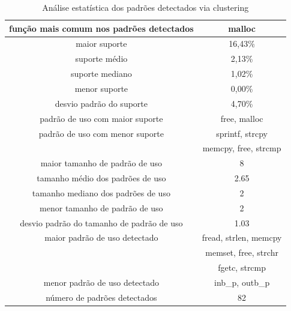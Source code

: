 \begin{table}[H]
\centering
  \begin{tabular}{ | c | c |}
\hline
função mais comum nos padrões detectados & malloc \\
\hline
maior suporte & 16,43\% \\
\hline
suporte médio & 2,13\% \\
\hline
suporte mediano & 1,02\% \\
\hline
menor suporte & 0,00\% \\
\hline
desvio padrão do suporte & 4,70\% \\
\hline
padrão de uso com maior suporte & free, malloc \\
\hline
padrão de uso com menor suporte & sprintf, strcpy \\
&  memcpy, free, strcmp \\
\hline
maior tamanho de padrão de uso & 8\\
\hline
tamanho médio dos padrões de uso & 2.65 \\
\hline
tamanho mediano dos padrões de uso & 2 \\
\hline
menor tamanho de padrão de uso & 2\\
\hline
desvio padrão do tamanho de padrão de uso & 1.03 \\
\hline
maior padrão de uso detectado & fread, strlen, memcpy\\
& memset, free, strchr\\
& fgetc, strcmp\\
\hline
menor padrão de uso detectado & inb\_p, outb\_p\\
\hline
número de padrões detectados & 82\\
\hline
\end{tabular}
\caption{Análise estatística dos padrões detectados via clustering}
\label{desc_clustering}
\end{table}

